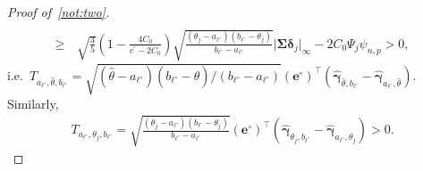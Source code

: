 \documentclass[11pt, a4paper]{article}
\newcommand{\mbf}{\mathbf}
\renewcommand{\l}{\left}
\renewcommand{\r}{\right}
\def\wh{\widehat}
\newcommand{\cp}{\theta}
\theoremstyle{definition}
\theoremstyle{definition}
\theoremstyle{definition}
\theoremstyle{definition}
\theoremstyle{definition}
\theoremstyle{remark}
\theoremstyle{definition}
\theoremstyle{definition}
\theoremstyle{definition}
\begin{document}
\begin{proof}[Proof of~\ref{not:two}]
\begin{align*}
	\\
	\ge & \, \sqrt{\frac{3}{5}} \l( 1 - \frac{4 C_0}{c^\prime - 2 C_0} \r) \sqrt{\frac{(\cp_j - a_{\ell^\circ})(b_{\ell^\circ} - \cp_j)}{b_{\ell^\circ} - a_{\ell^\circ}}} \vert \bm\Sigma \bm\delta_j \vert_\infty - 2 C_0 \Psi_j \psi_{n, p} > 0,
	\end{align*}
	i.e.\ $T_{a_{\ell^\circ}, \wh\cp, b_{\ell^\circ}} = \sqrt{(\wh\cp - a_{\ell^\circ})(b_{\ell^\circ} - \wh\cp)/(b_{\ell^\circ} - a_{\ell^\circ})} (\mbf e^\circ)^\top ( \wh{\bm\gamma}_{\wh\cp, b_{\ell^\circ}} - \wh{\bm\gamma}_{a_{\ell^\circ}, \wh\cp} )$.
	Similarly, 
	\begin{align*}
	T_{a_{\ell^\circ}, \cp_j, b_{\ell^\circ}} = \sqrt{\frac{(\cp_j - a_{\ell^\circ})(b_{\ell^\circ} - \cp_j)}{b_{\ell^\circ} - a_{\ell^\circ}}} (\mbf e^\circ)^\top \l( \wh{\bm\gamma}_{\cp_j, b_{\ell^\circ}} - \wh{\bm\gamma}_{a_{\ell^\circ}, \cp_j} \r) > 0.
	\end{align*}
	

\end{proof}
\end{document}
